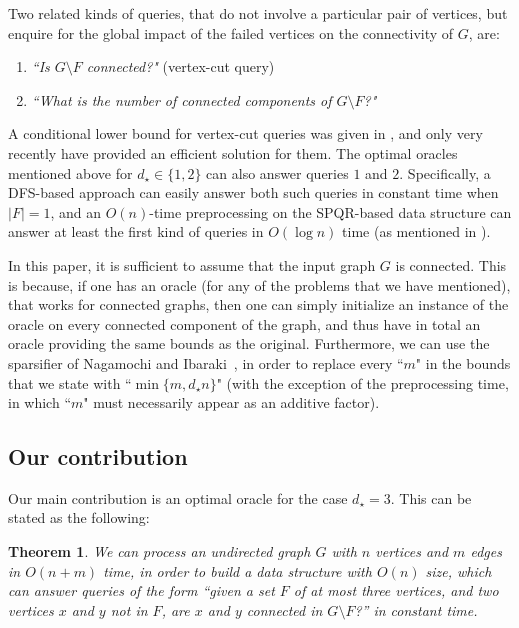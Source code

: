 \documentclass[11pt,a4paper]{article}
\newtheorem{theorem}{Theorem}[section]
\begin{document}
Two related kinds of queries, that do not involve a particular pair of vertices, but enquire for the global impact of the failed vertices on the connectivity of $G$, are: 

\begin{enumerate}
\item{\emph{``Is $G\setminus F$ connected?"} (vertex-cut query)}
\item{\emph{``What is the number of connected components of $G\setminus F$?"}}
\end{enumerate}

A conditional lower bound for vertex-cut queries was given in \cite{DBLP:conf/focs/LongS22}, and only very recently \cite{arxivMerav} have provided an efficient solution for them. The optimal oracles mentioned above for $d_{\star}\in\{1,2\}$ can also answer queries $1$ and $2$. Specifically, a DFS-based approach can easily answer both such queries in constant time when $|F|=1$, and an $O(n)$-time preprocessing on the SPQR-based data structure can answer at least the first kind of queries in $O(\log n)$ time (as mentioned in \cite{arxivMerav}).

In this paper, it is sufficient to assume that the input graph $G$ is connected. This is because, if one has an oracle (for any of the problems that we have mentioned), that works for connected graphs, then one can simply initialize an instance of the oracle on every connected component of the graph, and thus have in total an oracle providing the same bounds as the original. Furthermore, we can use the sparsifier of Nagamochi and Ibaraki~\cite{DBLP:journals/algorithmica/NagamochiI92}, in order to replace every ``$m$" in the bounds that we state with ``$\min\{m,d_{\star}n\}$" (with the exception of the preprocessing time, in which ``$m$" must necessarily appear as an additive factor).

\subsection{Our contribution}
Our main contribution is an optimal oracle for the case $d_{\star}=3$. This can be stated as the following:

\begin{theorem}
\label{theorem:main}
We can process an undirected graph $G$ with $n$ vertices and $m$ edges in $O(n+m)$ time, in order to build a data structure with $O(n)$ size, which can answer queries of the form ``given a set $F$ of at most three vertices, and two vertices $x$ and $y$ not in $F$, are $x$ and $y$ connected in $G\setminus F$?'' in constant time. 
\end{theorem}
\end{document}
